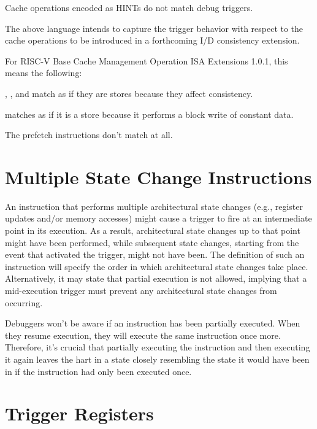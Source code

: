 Cache operations encoded as HINTs do not match debug triggers.

\begin{commentary}
    The above language intends to capture the trigger behavior with respect to
    the cache operations to be introduced in a forthcoming I/D consistency
    extension.

    \begin{steps}{For RISC-V Base Cache Management Operation ISA Extensions
            1.0.1, this means the following:}
        \item {}, , and  match as
            if they are stores because they affect consistency.
        \item {} matches as if it is a store because it performs a
            block write of constant data.
        \item The prefetch instructions don't match at all.
    \end{steps}
\end{commentary}

\section{Multiple State Change Instructions} \label{sec:multistate}

An instruction that performs multiple architectural state changes (e.g.,
register updates and/or memory accesses) might cause a trigger to fire at an
intermediate point in its execution. As a result, architectural state changes up
to that point might have been performed, while subsequent state changes,
starting from the event that activated the trigger, might not have been. The
definition of such an instruction will specify the order in which architectural
state changes take place. Alternatively, it may state that partial execution is
not allowed, implying that a mid-execution trigger must prevent any
architectural state changes from occurring.

Debuggers won't be aware if an instruction has been partially executed. When
they resume execution, they will execute the same instruction once more.
Therefore, it's crucial that partially executing the instruction and then
executing it again leaves the hart in a state closely resembling the state it
would have been in if the instruction had only been executed once.

\section{Trigger Registers}

